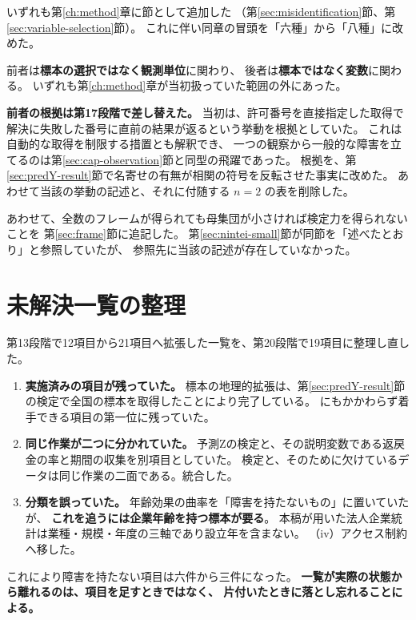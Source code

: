 いずれも第\ref{ch:method}章に節として追加した
（第\ref{sec:misidentification}節、第\ref{sec:variable-selection}節）。
これに伴い同章の冒頭を「六種」から「八種」に改めた。

前者は\textbf{標本の選択ではなく観測単位}に関わり、
後者は\textbf{標本ではなく変数}に関わる。
いずれも第\ref{ch:method}章が当初扱っていた範囲の外にあった。

\textbf{前者の根拠は第17段階で差し替えた。} 当初は、許可番号を直接指定した取得で
解決に失敗した番号に直前の結果が返るという挙動を根拠としていた。
これは自動的な取得を制限する措置とも解釈でき、
一つの観察から一般的な障害を立てるのは第\ref{sec:cap-observation}節と同型の飛躍であった。
根拠を、第\ref{sec:predY-result}節で名寄せの有無が相関の符号を反転させた事実に改めた。
あわせて当該の挙動の記述と、それに付随する $n=2$ の表を削除した。

あわせて、全数のフレームが得られても母集団が小さければ検定力を得られないことを
第\ref{sec:frame}節に追記した。
第\ref{sec:nintei-small}節が同節を「述べたとおり」と参照していたが、
参照先に当該の記述が存在していなかった。

\section{未解決一覧の整理}

第13段階で12項目から21項目へ拡張した一覧を、第20段階で19項目に整理し直した。

\begin{enumerate}[label=(\arabic*)]
\item \textbf{実施済みの項目が残っていた。}
標本の地理的拡張は、第\ref{sec:predY-result}節の検定で全国の標本を取得したことにより完了している。
にもかかわらず着手できる項目の第一位に残っていた。

\item \textbf{同じ作業が二つに分かれていた。}
予測Zの検定と、その説明変数である返戻金の率と期間の収集を別項目としていた。
検定と、そのために欠けているデータは同じ作業の二面である。統合した。

\item \textbf{分類を誤っていた。}
年齢効果の曲率を「障害を持たないもの」に置いていたが、
\textbf{これを追うには企業年齢を持つ標本が要る}。
本稿が用いた法人企業統計は業種・規模・年度の三軸であり設立年を含まない。
（iv）アクセス制約へ移した。
\end{enumerate}

これにより障害を持たない項目は六件から三件になった。
\textbf{一覧が実際の状態から離れるのは、項目を足すときではなく、
片付いたときに落とし忘れることによる。}

